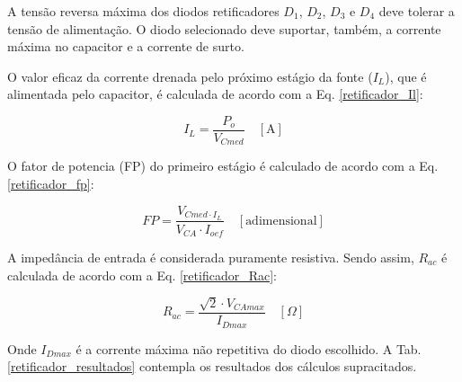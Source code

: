 \begin{apendicesenv}
A tensão reversa máxima dos diodos retificadores $D_{1}$, $D_{2}$, $D_{3}$ e $D_{4}$ deve tolerar a tensão de alimentação. O diodo selecionado deve suportar, também, a corrente máxima no capacitor e a corrente de surto.

O valor eficaz da corrente drenada pelo próximo estágio da fonte ($I_{L}$), que é alimentada pelo capacitor, é calculada de acordo com a Eq. \ref{retificador_Il}:

    \begin{equation}
        I_{L} = \frac{P_{o}}{V_{Cmed}} \quad [\text{A}]
        \label{retificador_Il}
    \end{equation}

O fator de potencia (FP) do primeiro estágio é calculado de acordo com a Eq. \ref{retificador_fp}:

    \begin{equation}
        FP = \frac{V_{Cmed \cdot I_{L}}}{ V_{CA} \cdot I_{oef}} \quad [\text{adimensional}]
        \label{retificador_fp}
    \end{equation}

A impedância de entrada é considerada puramente resistiva. Sendo assim, $R_{ac}$ é calculada de acordo com a Eq. \ref{retificador_Rac}:

    \begin{equation}
        R_{ac} = \frac{\sqrt{2} \cdot V_{CAmax}}{I_{Dmax}} \quad [\Omega]
        \label{retificador_Rac}
    \end{equation}
    
Onde $I_{Dmax}$ é a corrente máxima não repetitiva do diodo escolhido. 
A Tab. \ref{retificador_resultados} contempla os resultados dos cálculos supracitados.


\end{apendicesenv}
